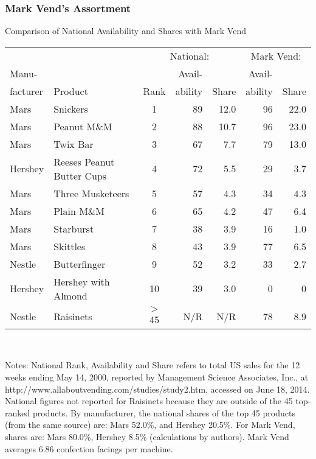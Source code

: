 \documentclass[aspectratio=169]{beamer}
\begin{document}
\begin{frame}
\frametitle{Mark Vend's Assortment}
\begin{center}
\vspace{-0.3in}
\scriptsize
Comparison of National Availability and Shares with Mark Vend
\begin{tabular}{|l|l|c|r|r|r|r|}
\hline
&&\multicolumn{3}{c|}{National:}&\multicolumn{2}{c|}{Mark Vend:} \\
Manu-& &&Avail-&& Avail- &  \\
facturer&Product &Rank&ability&Share& ability & Share \\
\hline \hline 
Mars& Snickers &1&89&12.0&96&22.0\\
Mars& Peanut M\&M&2&88&10.7&96&23.0\\
Mars& Twix Bar&3&67 &7.7&79&13.0\\
Hershey& Reeses Peanut Butter Cups &4&72&5.5& 29&3.7\\
Mars& Three Musketeers &5&57&4.3& 34&4.3\\
Mars& Plain M\&M  &6&65&4.2& 47&6.4\\
Mars& Starburst &7&38&3.9& 16&1.0\\
Mars& Skittles &8&43&3.9& 77&6.5\\
Nestle& Butterfinger &9&52&3.2& 33&2.7 \\
Hershey & Hershey with Almond &10&39&3.0&  0&0\\
Nestle& Raisinets &$>$45 &N/R &N/R& 78& 8.9\\
\hline
\end{tabular}\\
\end{center}
\begin{spacing}{0}
\tiny Notes: National Rank, Availability and Share refers to total US sales for the 12 weeks ending May 14, 2000, reported by Management Science Associates, Inc., at http://www.allaboutvending.com/studies/study2.htm, accessed on June 18, 2014.  National figures not reported for Raisinets because they are outside of the 45 top-ranked products.  By manufacturer, the national shares of the top 45 products (from the same source) are: Mars 52.0\%, and Hershey 20.5\%.  For Mark Vend, shares are: Mars 80.0\%, Hershey 8.5\% (calculations by authors).  Mark Vend averages 6.86 confection facings per machine.
\end{spacing}
\end{frame}
\end{document}
